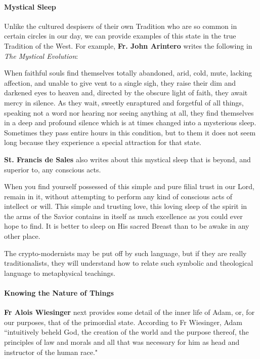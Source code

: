 \paragraph{Mystical Sleep}
Unlike the cultured despisers of their own Tradition who are so common in certain circles in our day, we can provide examples of this state in the true Tradition of the West. For example, \textbf{Fr. John Arintero} writes the following in \emph{The Mystical Evolution}:

\begin{quotex}
When faithful souls find themselves totally abandoned, arid, cold, mute, lacking affection, and unable to give vent to a single sigh, they raise their dim and darkened eyes to heaven and, directed by the obscure light of faith, they await mercy in silence. As they wait, sweetly enraptured and forgetful of all things, speaking not a word nor hearing nor seeing anything at all, they find themselves in a deep and profound silence which is at times changed into a mysterious sleep. Sometimes they pass entire hours in this condition, but to them it does not seem long because they experience a special attraction for that state.

\end{quotex}
\textbf{St. Francis de Sales} also writes about this mystical sleep that is beyond, and superior to, any conscious acts.

\begin{quotex}
When you find yourself possessed of this simple and pure filial trust in our Lord, remain in it, without attempting to perform any kind of conscious acts of intellect or will. This simple and trusting love, this loving sleep of the spirit in the arms of the Savior contains in itself as much excellence as you could ever hope to find. It is better to sleep on His sacred Breast than to be awake in any other place.

\end{quotex}
The crypto-modernists may be put off by such language, but if they are really traditionalists, they will understand how to relate such symbolic and theological language to metaphysical teachings.

\paragraph{Knowing the Nature of Things}

\textbf{Fr Alois Wiesinger} next provides some detail of the inner life of Adam, or, for our purposes, that of the primordial state. According to Fr Wiesinger, Adam ``intuitively beheld God, the creation of the world and the purpose thereof, the principles of law and morals and all that was necessary for him as head and instructor of the human race."

